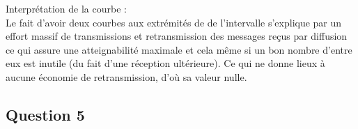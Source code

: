 \documentclass[10pt]{report}
\begin{document}
Interprétation de la courbe :\\

Le fait d'avoir deux courbes aux extrémités de de l'intervalle s'explique par un effort massif de transmissions et retransmission des messages reçus par diffusion ce qui assure une atteignabilité maximale et cela même si un bon nombre d'entre eux est inutile (du fait d'une réception ultérieure). Ce qui ne donne lieux à aucune économie de retransmission, d'où sa valeur nulle.

\newpage
\subsection{Question 5}
\end{document}
